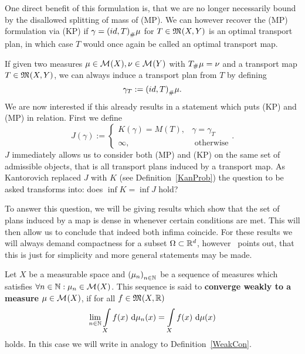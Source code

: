 One direct benefit of this formulation is, that we are no longer necessarily bound by the disallowed splitting of mass of (MP). We can however recover the (MP) formulation via (KP) if $\gamma = \push[(id, T)]{\mu}$ for $T \in \MF{X}{Y}$ is an optimal transport plan, in which case $T$ would once again be called an optimal transport map.

If given two measures $\mu \in \M{X}, \nu \in \M{Y}$ with $\push{\mu} = \nu$ and a transport map $T \in \MF{X}{Y}$, we can always induce a transport plan from $T$ by defining
\begin{equation}\label{IndPlan}
	\gamma_T := \push[(id, T)]{\mu}.
\end{equation}
We are now interested if this already results in a statement which puts (KP) and (MP) in relation. First we define
\[ J(\gamma) := 
	\begin{cases}
		K(\gamma) = M(T), & \gamma = \gamma_T \\
		\infty, & \text{ otherwise}
	\end{cases}. \]
$J$ immediately allows us to consider both (MP) and (KP) on the same set of admissible objects, that is all transport plans induced by a transport map. As Kantorovich replaced $J$ with $K$ (see Definition~\ref{KanProb}) the question to be asked transforms into: does $\inf K = \inf J$ hold?

To answer this question, we will be giving results which show that the set of plans induced by a map is dense in \TP{\mu, \nu} whenever certain conditions are met. This will then allow us to conclude that indeed both infima coincide. For these results we will always demand compactness for a subset $\Omega \subset \R^d$, however~\cite{San2015} points out, that this is just for simplicity and more general statements may be made.

\begin{definition}\label{WeakConMeas}
	Let $X$ be a measurable space and ${(\mu_n)}_{\NinN}$ be a sequence of measures which satisfies $\forall \NinN: \mu_n \in \M{X}$. This sequence is said to \textbf{converge weakly to a measure} $\mu \in \M{X}$, if for all $f \in \MF{X}{\R}$ 
	\[ \lim\limits_{\NinN} \int\limits_X f(x)~\Dx{\mu_n} = \int\limits_X f(x)~\Dx{\mu} \]
	holds. In this case we will write  in analogy to Definition~\ref{WeakCon}.
\end{definition}

